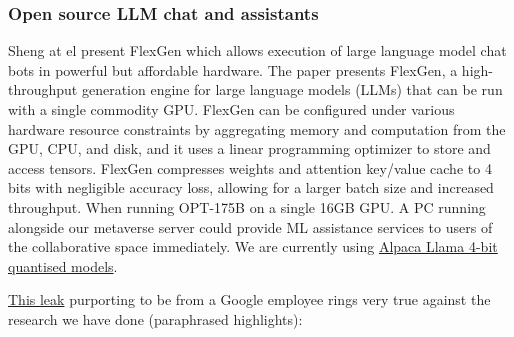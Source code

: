 \subsubsection{Open source LLM chat and assistants}
Sheng at el present FlexGen which allows execution of large language model chat bots in powerful but affordable hardware\cite{Sheng2023}. The paper presents FlexGen, a high-throughput generation engine for large language models (LLMs) that can be run with a single commodity GPU. FlexGen can be configured under various hardware resource constraints by aggregating memory and computation from the GPU, CPU, and disk, and it uses a linear programming optimizer to store and access tensors. FlexGen compresses weights and attention key/value cache to 4 bits with negligible accuracy loss, allowing for a larger batch size and increased throughput. When running OPT-175B on a single 16GB GPU. A PC running alongside our metaverse server could provide ML assistance services to users of the collaborative space immediately. We are currently using \href{https://huggingface.co/Pi3141/alpaca-lora-30B-ggml/tree/main}{Alpaca Llama 4-bit quantised models}.\par 
\bigskip
\href{https://www.semianalysis.com/p/google-we-have-no-moat-and-neither}{This leak} purporting to be from a Google employee rings very true against the research we have done (paraphrased highlights):
